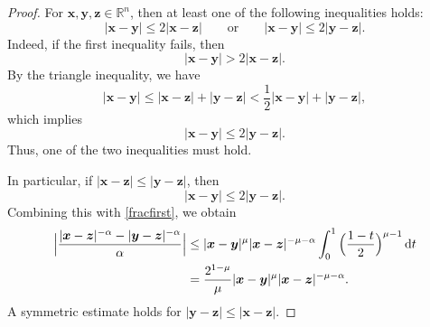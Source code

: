 \documentclass[reqno,11pt]{amsart}
\numberwithin{equation}{section}
\theoremstyle{definition}
\def\dd{{\, \rm d}}
\begin{document}
\begin{proof}
For $\boldsymbol{x},\boldsymbol{y},\boldsymbol{z} \in \mathbb{R}^n$, then at least one of the following
inequalities holds:
$$
|\boldsymbol{x} - \boldsymbol{y}| \leq 2 |\boldsymbol{x} - \boldsymbol{z}|
\qquad\mbox{or}\qquad |\boldsymbol{x} - \boldsymbol{y}| \leq 2 |\boldsymbol{y} - \boldsymbol{z}|.
$$ 
Indeed, if the first inequality fails, then
$$
|\boldsymbol{x} - \boldsymbol{y}| > 2 |\boldsymbol{x} - \boldsymbol{z}|.
$$ 
By the triangle inequality, we have
\[
 |\boldsymbol{x} - \boldsymbol{y}| \leq |\boldsymbol{x} - \boldsymbol{z}| + |\boldsymbol{y} - \boldsymbol{z}| < \frac{1}{2} |\boldsymbol{x} - \boldsymbol{y}| + |\boldsymbol{y} - \boldsymbol{z}|,
 \]
which implies
$$
|\boldsymbol{x} - \boldsymbol{y}| \leq 2 |\boldsymbol{y} - \boldsymbol{z}|.
$$
Thus, one of the two inequalities must hold.

In particular, if $|\boldsymbol{x} - \boldsymbol{z}| \leq |\boldsymbol{y} - \boldsymbol{z}|$, then $$
|\boldsymbol{x} - \boldsymbol{y}| \leq 2 |\boldsymbol{y} - \boldsymbol{z}|.
$$
Combining this with \eqref{fracfirst}, we obtain
 \begin{align}\label{fracsecond}
 \begin{split}
 \Big| \frac{|\boldsymbol{x} - \boldsymbol{z}|^{-\alpha} - |\boldsymbol{y} - \boldsymbol{z}|^{-\alpha}}{\alpha} \Big| & \leq |\boldsymbol{x} - \boldsymbol{y}|^\mu |\boldsymbol{x} - \boldsymbol{z}|^{-\mu - \alpha} \int^1_0 \Big ( \frac{1-t}{2}\Big )^{\mu - 1} \dd t \\
 & = \frac{2^{1-\mu}}{\mu}|\boldsymbol{x} - \boldsymbol{y}|^\mu |\boldsymbol{x} - \boldsymbol{z}|^{-\mu - \alpha}.
  \end{split}
 \end{align}
A symmetric estimate holds for $|\boldsymbol{y} - \boldsymbol{z}| \leq |\boldsymbol{x} - \boldsymbol{z}|$. 


\end{proof}
\end{document}
